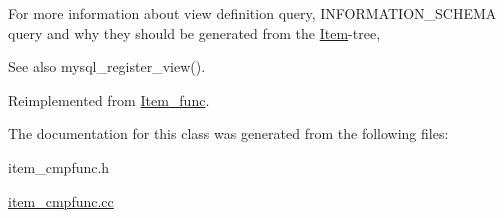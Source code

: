 For more information about view definition query, I\+N\+F\+O\+R\+M\+A\+T\+I\+O\+N\+\_\+\+S\+C\+H\+E\+MA query and why they should be generated from the \mbox{\hyperlink{classItem}{Item}}-\/tree, \begin{DoxySeeAlso}{See also}
mysql\+\_\+register\+\_\+view(). 
\end{DoxySeeAlso}


Reimplemented from \mbox{\hyperlink{classItem__func_afb302ee25d4721ace27d3f5053d4ee41}{Item\+\_\+func}}.



The documentation for this class was generated from the following files\+:\begin{DoxyCompactItemize}
\item 
item\+\_\+cmpfunc.\+h\item 
\mbox{\hyperlink{item__cmpfunc_8cc}{item\+\_\+cmpfunc.\+cc}}\end{DoxyCompactItemize}
